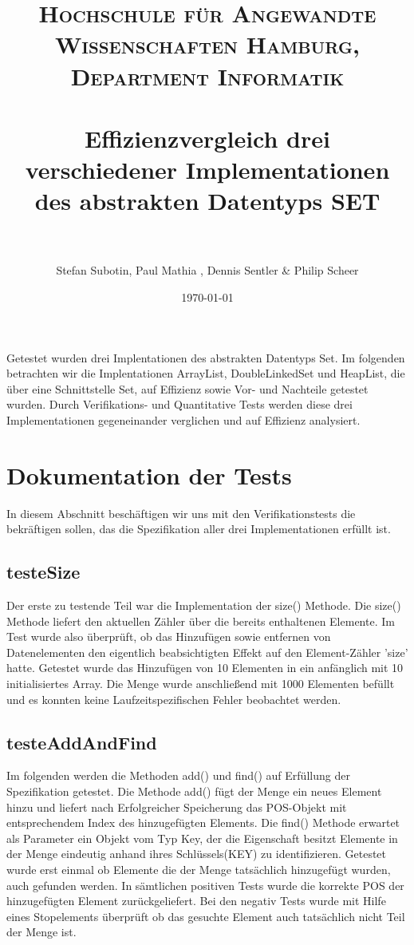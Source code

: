 \documentclass[paper=a4, fontsize=11pt]{scrartcl} %
\title{	
\normalfont \normalsize 
\textsc{Hochschule f\"ur Angewandte Wissenschaften Hamburg, Department Informatik} \\ [25pt] %
\horrule{0.5pt} \\[0.4cm] %
\huge Effizienzvergleich drei verschiedener Implementationen des abstrakten Datentyps SET \\ %
\horrule{2pt} \\[0.5cm] %
}
\author{Stefan Subotin, Paul Mathia , Dennis Sentler & Philip Scheer} %
\date{\normalsize\today} %
\numberwithin{equation}{section} %
\numberwithin{figure}{section} %
\numberwithin{table}{section} %
\begin{document}
\maketitle %
Getestet wurden drei Implentationen des abstrakten Datentyps Set. Im folgenden betrachten wir die Implentationen ArrayList, DoubleLinkedSet und HeapList, die über eine Schnittstelle Set,
auf Effizienz sowie Vor- und Nachteile getestet wurden. Durch Verifikations- und Quantitative Tests werden diese drei Implementationen gegeneinander verglichen und auf Effizienz analysiert.\newline


\section{Dokumentation der Tests}
In diesem Abschnitt beschäftigen wir uns mit den Verifikationstests die bekräftigen sollen, das die Spezifikation aller drei Implementationen erfüllt ist. 

\subsection{testeSize}
Der erste zu testende Teil war die Implementation der size() Methode. Die size() Methode liefert den aktuellen Zähler über die bereits enthaltenen Elemente.
Im Test wurde also überprüft, ob das Hinzufügen sowie entfernen von Datenelementen den eigentlich beabsichtigten Effekt auf den Element-Zähler 'size' hatte. 
Getestet wurde das Hinzufügen von 10 Elementen in ein anfänglich mit 10 initialisiertes Array. Die Menge wurde anschließend mit 1000 Elementen befüllt
und es konnten keine Laufzeitspezifischen Fehler beobachtet werden. 

\subsection{testeAddAndFind}
Im folgenden werden die Methoden add() und find() auf Erfüllung der Spezifikation getestet. Die Methode add() fügt der Menge ein neues Element hinzu und liefert nach
Erfolgreicher Speicherung das POS-Objekt mit entsprechendem Index des hinzugefügten Elements. Die find() Methode erwartet als Parameter ein Objekt vom Typ Key, der die
Eigenschaft besitzt Elemente in der Menge eindeutig anhand ihres Schlüssels(KEY) zu identifizieren. Getestet wurde erst einmal ob Elemente die der Menge tatsächlich hinzugefügt
wurden, auch gefunden werden. In sämtlichen positiven Tests wurde die korrekte POS der hinzugefügten Element zurückgeliefert. Bei den negativ Tests wurde mit Hilfe eines
Stopelements überprüft ob das gesuchte Element auch tatsächlich nicht Teil der Menge ist.  
\end{document}
